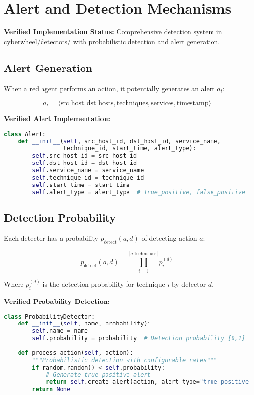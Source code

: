 \documentclass[12pt,a4paper]{article}
\begin{document}
\section{Alert and Detection Mechanisms}

\textbf{Verified Implementation Status:} Comprehensive detection system in cyberwheel/detectors/ with probabilistic detection and alert generation.

\subsection{Alert Generation}
When a red agent performs an action, it potentially generates an alert $a_t$:

\begin{equation}
a_t = \langle \text{src\_host}, \text{dst\_hosts}, \text{techniques}, \text{services}, \text{timestamp} \rangle
\end{equation}

\textbf{Verified Alert Implementation:}
\begin{lstlisting}[language=Python, caption=Alert Class (cyberwheel/detectors/alert.py)]
class Alert:
    def __init__(self, src_host_id, dst_host_id, service_name, 
                 technique_id, start_time, alert_type):
        self.src_host_id = src_host_id
        self.dst_host_id = dst_host_id  
        self.service_name = service_name
        self.technique_id = technique_id
        self.start_time = start_time
        self.alert_type = alert_type  # true_positive, false_positive
\end{lstlisting}

\subsection{Detection Probability}
Each detector has a probability $p_{\text{detect}}(a, d)$ of detecting action $a$:

\begin{equation}
p_{\text{detect}}(a, d) = \prod_{i=1}^{|a.\text{techniques}|} p_i^{(d)}
\end{equation}

Where $p_i^{(d)}$ is the detection probability for technique $i$ by detector $d$.

\textbf{Verified Probability Detection:}
\begin{lstlisting}[language=Python, caption=Probabilistic Detector (cyberwheel/detectors/detectors/probability\_detector.py)]
class ProbabilityDetector:
    def __init__(self, name, probability):
        self.name = name
        self.probability = probability  # Detection probability [0,1]
        
    def process_action(self, action):
        """Probabilistic detection with configurable rates"""
        if random.random() < self.probability:
            # Generate true positive alert
            return self.create_alert(action, alert_type="true_positive")
        return None
\end{lstlisting}
\end{document}

